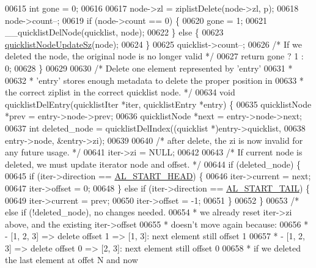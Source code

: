 \begin{DoxyCode}
{00615     \textcolor{keywordtype}{int} gone = 0;
00616 
00617     node->zl = ziplistDelete(node->zl, p);
00618     node->count--;
00619     \textcolor{keywordflow}{if} (node->count == 0) \{
00620         gone = 1;
00621         \_\_quicklistDelNode(quicklist, node);
00622     \} \textcolor{keywordflow}{else} \{
00623         \hyperlink{quicklist_8c_a03a3947a9423d234923343702619c553}{quicklistNodeUpdateSz}(node);
00624     \}
00625     quicklist->count--;
00626     \textcolor{comment}{/* If we deleted the node, the original node is no longer valid */}
00627     \textcolor{keywordflow}{return} gone ? 1 : 0;
00628 \}
00629 
00630 \textcolor{comment}{/* Delete one element represented by 'entry'}
00631 \textcolor{comment}{ *}
00632 \textcolor{comment}{ * 'entry' stores enough metadata to delete the proper position in}
00633 \textcolor{comment}{ * the correct ziplist in the correct quicklist node. */}
00634 \textcolor{keywordtype}{void} quicklistDelEntry(quicklistIter *iter, quicklistEntry *entry) \{
00635     quicklistNode *prev = entry->node->prev;
00636     quicklistNode *next = entry->node->next;
00637     \textcolor{keywordtype}{int} deleted\_node = quicklistDelIndex((quicklist *)entry->quicklist,
00638                                          entry->node, &entry->zi);
00639 
00640     \textcolor{comment}{/* after delete, the zi is now invalid for any future usage. */}
00641     iter->zi = NULL;
00642 
00643     \textcolor{comment}{/* If current node is deleted, we must update iterator node and offset. */}
00644     \textcolor{keywordflow}{if} (deleted\_node) \{
00645         \textcolor{keywordflow}{if} (iter->direction == \hyperlink{adlist_8h_a353f032fdd7e66abe9f194fa7c89560b}{AL\_START\_HEAD}) \{
00646             iter->current = next;
00647             iter->offset = 0;
00648         \} \textcolor{keywordflow}{else} \textcolor{keywordflow}{if} (iter->direction == \hyperlink{adlist_8h_a7d37e2046bb8d302b8ca5de4883a1c7f}{AL\_START\_TAIL}) \{
00649             iter->current = prev;
00650             iter->offset = -1;
00651         \}
00652     \}
00653     \textcolor{comment}{/* else if (!deleted\_node), no changes needed.}
00654 \textcolor{comment}{     * we already reset iter->zi above, and the existing iter->offset}
00655 \textcolor{comment}{     * doesn't move again because:}
00656 \textcolor{comment}{     *   - [1, 2, 3] => delete offset 1 => [1, 3]: next element still offset 1}
00657 \textcolor{comment}{     *   - [1, 2, 3] => delete offset 0 => [2, 3]: next element still offset 0}
00658 \textcolor{comment}{     *  if we deleted the last element at offet N and now}
}
\end{DoxyCode}
